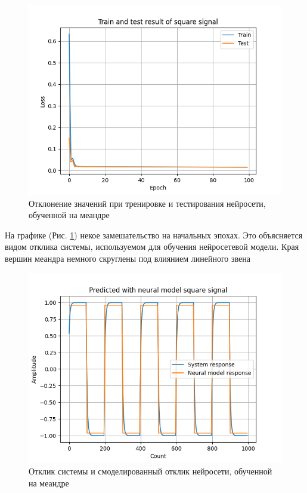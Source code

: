\begin{figure}[H]
	\centering
	\includegraphics[width=1\linewidth]{body/images/Train-and-test-result-of-square-signal.png}
	\caption{Отклонение значений при тренировке и тестирования нейросети, обученной на меандре}
	\label{fig:23}
\end{figure}

На графике (Рис. \ref{fig:23}) некое замешательство на начальных эпохах. Это объясняется видом отклика системы, используемом для обучения нейросетевой 
модели. Края вершин меандра немного скруглены под влиянием линейного звена

\begin{figure}[H]
	\centering
	\includegraphics[width=1\linewidth]{body/images/Predicted-with-neural-model-square-signal.png}
	\caption{Отклик системы и смоделированный отклик нейросети, обученной на меандре}
	\label{fig:24}
\end{figure}

